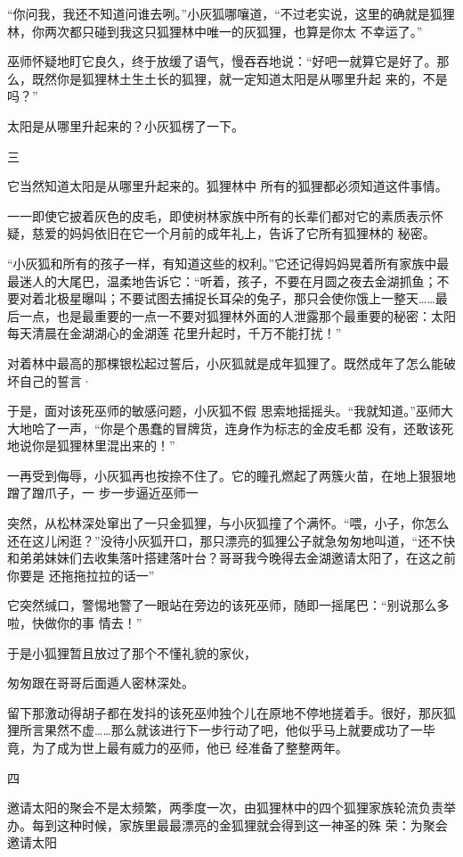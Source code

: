 \documentclass{article}
\begin{document}
“你问我，我还不知道问谁去咧。”小灰狐哪嚷道，“不过老实说，这里的确就是狐狸林，你两次都只碰到我这只狐狸林中唯一的灰狐狸，也算是你太
不幸运了。” 

巫师怀疑地盯它良久，终于放缓了语气，慢吞吞地说：“好吧一就算它是好了。那么，既然你是狐狸林土生土长的狐狸，就一定知道太阳是从哪里升起
来的，不是吗？” 


太阳是从哪里升起来的？小灰狐楞了一下。 


三 

\newpage

它当然知道太阳是从哪里升起来的。狐狸林中
所有的狐狸都必须知道这件事情。 

一一即使它披着灰色的皮毛，即使树林家族中所有的长辈们都对它的素质表示怀疑，慈爱的妈妈依旧在它一个月前的成年礼上，告诉了它所有狐狸林的
秘密。 

“小灰狐和所有的孩子一样，有知道这些的权利。”它还记得妈妈晃着所有家族中最最迷人的大尾巴，温柔地告诉它：“听着，孩子，不要在月圆之夜去金湖抓鱼；不要对着北极星曝叫；不要试图去捕捉长耳朵的兔子，那只会使你饿上一整天……最后一点，也是最重要的一点一不要对狐狸林外面的人泄露那个最重要的秘密：太阳每天清晨在金湖湖心的金湖莲
花里升起时，千万不能打扰！” 

对着林中最高的那棵银松起过誓后，小灰狐就是成年狐狸了。既然成年了怎么能破坏自己的誓言·

于是，面对该死巫师的敏感问题，小灰狐不假
\newpage
思索地摇摇头。“我就知道。”巫师大大地哈了一声，“你是个愚蠢的冒牌货，连身作为标志的金皮毛都
没有，还敢该死地说你是狐狸林里混出来的！” 

一再受到侮辱，小灰狐再也按捺不住了。它的瞳孔燃起了两簇火苗，在地上狠狠地蹭了蹭爪子，一
步一步逼近巫师一 

突然，从松林深处窜出了一只金狐狸，与小灰狐撞了个满怀。“喂，小子，你怎么还在这儿闲逛？”没待小灰狐开口，那只漂亮的狐狸公子就急匆匆地叫道，“还不快和弟弟妹妹们去收集落叶搭建落叶台？哥哥我今晚得去金湖邀请太阳了，在这之前你要是
还拖拖拉拉的话一” 

它突然缄口，警惕地警了一眼站在旁边的该死巫师，随即一摇尾巴：“别说那么多啦，快做你的事
情去！” 

于是小狐狸暂且放过了那个不懂礼貌的家伙，

\newpage
匆匆跟在哥哥后面遁人密林深处。 

留下那激动得胡子都在发抖的该死巫帅独个儿在原地不停地搓着手。很好，那灰狐狸所言果然不虚……那么就该进行下一步行动了吧，他似乎马上就要成功了一毕竟，为了成为世上最有威力的巫师，他已
经准备了整整两年。 


四 

邀请太阳的聚会不是太频繁，两季度一次，由狐狸林中的四个狐狸家族轮流负责举办。每到这种时候，家族里最最漂亮的金狐狸就会得到这一神圣的殊
荣：为聚会邀请太阳 
\end{document}
